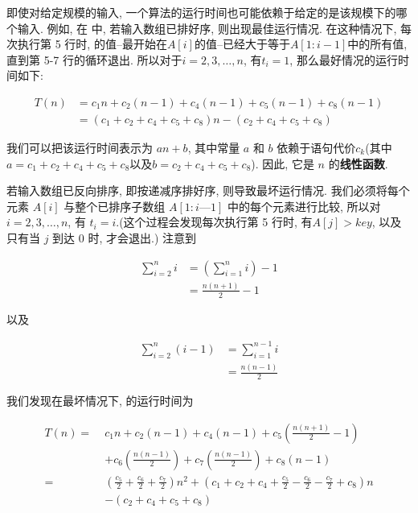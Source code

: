 \documentclass[oneside,10pt,fontset=none]{ctexbook}
\begin{document}
即使对给定规模的输入, 一个算法的运行时间也可能依赖于给定的是该规模下的哪个输入. 例如, 在  中, 若输入数组已排好序, 则出现最佳运行情况. 在这种情况下, 每次执行第 5 行时, 的值--最开始在$A[i]$的值--已经大于等于$A[1:i-1]$中的所有值, 直到第 5-7 行的循环退出. 所以对于$i = 2,3,\dots,n$, 有$t_i=1$, 那么最好情况的运行时间如下:

\begin{equation}\begin{aligned}
T(n) &= c_1n + c_2(n-1) + c_4(n-1) + c_5(n-1) + c_8(n-1) \\
     &= (c_1+c_2+c_4+c_5+c_8)n - (c_2+c_4+c_5+c_8)
\end{aligned}\end{equation}

我们可以把该运行时间表示为 $an+b$, 其中常量 $a$ 和 $b$ 依赖于语句代价$c_k$(其中$a=c_1+c_2+c_4+c_5+c_8\text{以及}b=c_2+c_4+c_5+c_8$). 因此, 它是 $n$ 的\textbf{线性函数}.

若输入数组已反向排序, 即按递减序排好序, 则导致最坏运行情况. 我们必须将每个元素 $A[i]$ 与整个已排序子数组 $A[1:i—1]$ 中的每个元素进行比较, 所以对 $i=2,3,\dots,n$, 有 $t_i=i$.(这个过程会发现每次执行第 5 行时, 有$A[j]>key$, 以及只有当 $j$ 到达 0 时, 才会退出.) 注意到

\begin{equation*}\begin{split}
\sum_{i=2}^{n}i &= (\sum_{i=1}^{n}i) - 1 \\
                &= \frac{n(n+1)}{2} - 1
\end{split}\end{equation*}

以及

\begin{equation*}\begin{split}
\sum_{i=2}^{n}(i-1) &= \sum_{i=1}^{n-1}i \\
                    &= \frac{n(n-1)}{2}
\end{split}\end{equation*}

我们发现在最坏情况下,  的运行时间为

\begin{equation}\begin{aligned}
T(n) =\; &c_1n + c_2(n-1) + c_4(n-1) + c_5(\frac{n(n+1)}{2}-1) \\
&+c_6(\frac{n(n-1)}{2})+c_7(\frac{n(n-1)}{2})+c_8(n-1) \\
=\; &(\frac{c_5}{2}+\frac{c_6}{2}+\frac{c_7}{2})n^2 + (c_1+c_2+c_4+\frac{c_5}{2}-\frac{c_6}{2}-\frac{c_7}{2}+c_8)n \\
&-(c_2+c_4+c_5+c_8)
\end{aligned}\end{equation}
\end{document}
